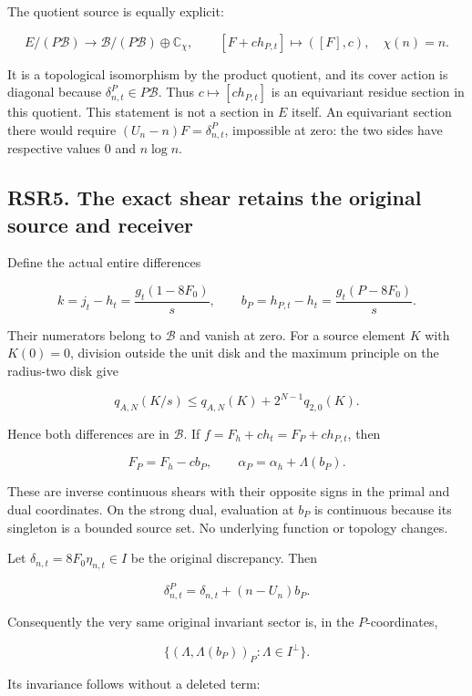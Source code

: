 The quotient source is equally explicit:

\[
E/(P\mathcal B)\longrightarrow
\mathcal B/(P\mathcal B)\oplus\mathbb C_\chi,
\qquad[F+ch_{P,t}]\longmapsto([F],c),\quad\chi(n)=n.
\tag{RSR4.5}
\]

It is a topological isomorphism by the product quotient, and its cover
action is diagonal because \(\delta^P_{n,t}\in P\mathcal B\). Thus
\(c\mapsto[ch_{P,t}]\) is an equivariant residue section in this
quotient. This statement is not a section in \(E\) itself. An
equivariant section there would require \((U_n-n)F=\delta^P_{n,t}\),
impossible at zero: the two sides have respective values \(0\) and
\(n\log n\).

\subsection{RSR5. The exact shear retains the original source and
receiver}\label{rsr5.-the-exact-shear-retains-the-original-source-and-receiver}

Define the actual entire differences

\[
k=j_t-h_t=\frac{g_t(1-8F_0)}s,\qquad
b_P=h_{P,t}-h_t=\frac{g_t(P-8F_0)}s.
\tag{RSR5.1}
\]

Their numerators belong to \(\mathcal B\) and vanish at zero. For a
source element \(K\) with \(K(0)=0\), division outside the unit disk and
the maximum principle on the radius-two disk give

\[
q_{A,N}(K/s)\le q_{A,N}(K)+2^{N-1}q_{2,0}(K).
\tag{RSR5.2}
\]

Hence both differences are in \(\mathcal B\). If
\(f=F_h+ch_t=F_P+ch_{P,t}\), then

\[
F_P=F_h-cb_P,
\qquad \alpha_P=\alpha_h+\Lambda(b_P).
\tag{RSR5.3}
\]

These are inverse continuous shears with their opposite signs in the
primal and dual coordinates. On the strong dual, evaluation at \(b_P\)
is continuous because its singleton is a bounded source set. No
underlying function or topology changes.

Let \(\delta_{n,t}=8F_0\eta_{n,t}\in I\) be the original discrepancy.
Then

\[
\delta^P_{n,t}=\delta_{n,t}+(n-U_n)b_P.
\tag{RSR5.4}
\]

Consequently the very same original invariant sector is, in the
\(P\)-coordinates,

\[
\{(\Lambda,\Lambda(b_P))_P:\Lambda\in I^\perp\}.
\tag{RSR5.5}
\]

Its invariance follows without a deleted term:

